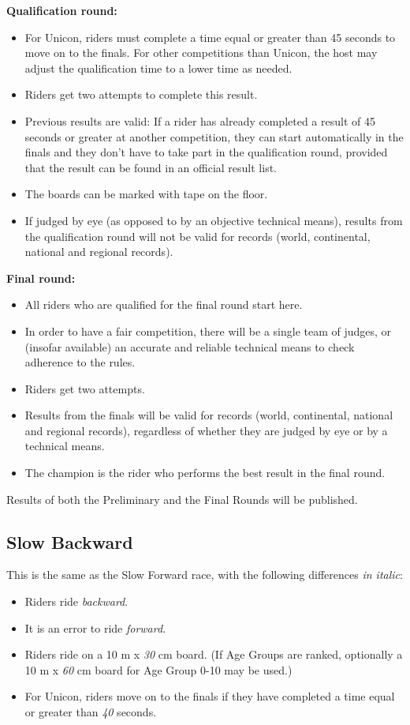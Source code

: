 \textbf{Qualification round:}
\begin{itemize}
\item For Unicon, riders must complete a time equal or greater than 45 seconds to move on to the finals.
  For other competitions than Unicon, the host may adjust the qualification time to a lower time as needed.
\item Riders get two attempts to complete this result.
\item Previous results are valid: If a rider has already completed a result of 45 seconds or greater at another competition, they can start automatically in the finals and they don't have to take part in the qualification round, provided that the result can be found in an official result list.
\item The boards can be marked with tape on the floor.
\item If judged by eye (as opposed to by an objective technical means), results from the qualification round will not be valid for records (world, continental, national and regional records).
\end{itemize}

\textbf{Final round:}
\begin{itemize}
\item All riders who are qualified for the final round start here.
\item In order to have a fair competition, there will be a single team of judges, or (insofar available) an accurate and reliable technical means to check adherence to the rules.
\item Riders get two attempts.
\item Results from the finals will be valid for records (world, continental, national and regional records), regardless of whether they are judged by eye or by a technical means.
\item The champion is the rider who performs the best result in the final round.
\end{itemize}

Results of both the Preliminary and the Final Rounds will be published.

\subsection{Slow Backward}
This is the same as the Slow Forward race, with the following differences \textit {in italic}:
\begin{itemize}
\item Riders ride \textit{backward}.
\item It is an error to ride \textit{forward}.
\item Riders ride on a 10 m x \textit{30} cm board.
  (If Age Groups are ranked, optionally a 10 m x \textit{60} cm board for Age Group 0-10 may be used.)
\item For Unicon, riders move on to the finals if they have completed a time equal or greater than \textit{40} seconds.
\end{itemize}

